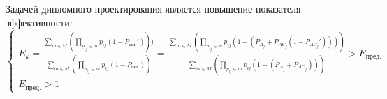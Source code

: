 
\vspace{\baselineskip}
Задачей дипломного проектирования является повышение показателя эффективности:
\begin{equation}
  \label{eq:mathtask}
\begin{cases}
   E_k=\frac{\sum_{m \in M} (\prod_{p_{ij} \in m} p_{ij}(1-P_{\textrm{ош.}}')))}{\sum_{m \in M} (\prod_{p_{ij} \in m} p_{ij}(1-P_{\textrm{ош.}}))} = \frac{\sum_{m \in M} (\prod_{p_{ij} \in m} p_{ij}(1-(P_{A_j}+P_{{AC}_j}(1-P_{{AC}_j}'))))}{\sum_{m \in M} (\prod_{p_{ij} \in m} p_{ij}(1-(P_{A_j}+P_{{AC}_j})))} > E_{\textrm{пред.}} \\
   E_{\textrm{пред.}} > 1
  \end{cases}
\end{equation}
